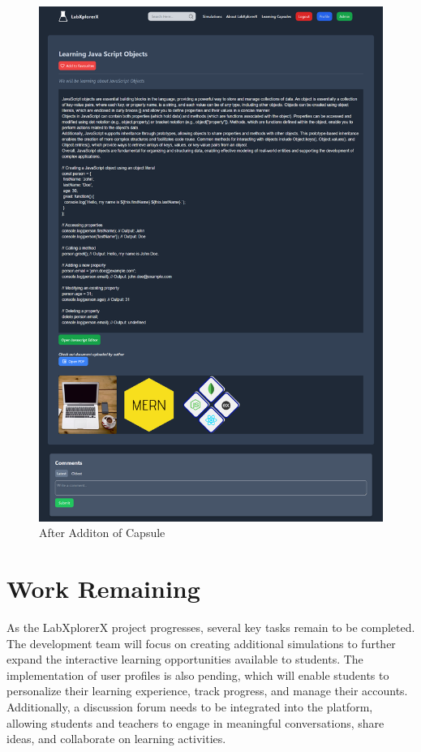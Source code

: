  \begin{figure}[H]
    \centering
     \includegraphics[width = 16cm]{Diagrams/output/after_addition.png}
     \caption{After Additon of Capsule}
 \end{figure}
\section{Work Remaining}
As the LabXplorerX project progresses, several key tasks remain to be completed. The development team will focus on creating additional simulations to further expand the interactive learning opportunities available to students. The implementation of user profiles is also pending, which will enable students to personalize their learning experience, track progress, and manage their accounts. Additionally, a discussion forum needs to be integrated into the platform, allowing students and teachers to engage in meaningful conversations, share ideas, and collaborate on learning activities.


